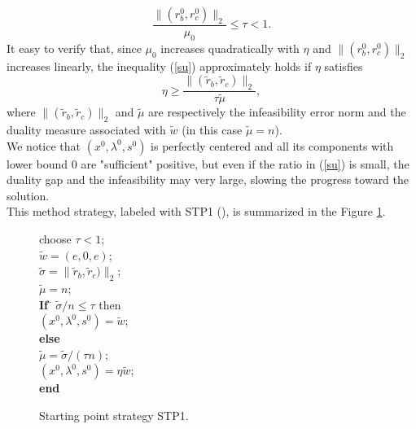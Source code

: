 \documentclass[a4paper,10 pt,titlepage,twoside]{book}
\theoremstyle{plain}
\theoremstyle{definition}
\theoremstyle{remark}
\begin{document}
\begin{equation}\label{su}
\frac{\lVert(r^{0}_{b},r^{0}_{c})\rVert_{2}}{\mu_{0}}\leq \tau<1. 
\end{equation}
It easy to verify that, since $\mu_{0}$ increases quadratically with $\eta$ and $\lVert(r^{0}_{b},r^{0}_{c})\rVert_{2}$ increases linearly, the inequality (\ref{su}) approximately holds if $\eta$ satisfies
\begin{equation*}
\eta\geq \frac{\lVert(\tilde{r}_{b},\tilde{r}_{c})\rVert_{2}}{\tau\tilde{\mu}},
\end{equation*}
where $\lVert(\tilde{r}_{b},\tilde{r}_{c})\rVert_{2}$ and $\tilde{\mu}$ are respectively the infeasibility error norm and the duality measure associated with $\tilde{w}$ (in this case $\tilde{\mu} = n$). \\
We notice that $(x^{0},\lambda^{0},s^{0})$ is perfectly centered and all its components with lower bound 0 are "sufficient" positive, but even if the ratio in (\ref{su}) is small, the duality gap and the infeasibility may very large, slowing the progress toward the solution.\\
This method strategy, labeled with STP1 (\cite{SPS}), is summarized in the Figure \ref{fig:STP2}.\\
\begin{figure}\caption{\label{fig:STP2}Starting point strategy STP1.}
	\centering
	{\noindent\begin{boxedminipage}{1\linewidth}
			\begin{tabbing}
			choose $\tau < 1$; \\
			$\tilde{w}=(e,0,e)$;\\
			$\tilde{\sigma}= \lVert\tilde{r}_{b},\tilde{r}_{c})\rVert_{2}$;\\
			$\tilde{\mu}= n$;\\
			\textbf{If} \= $\tilde{\sigma}/n\leq \tau$ then\\
			\> $(x^{0}, \lambda^{0}, s^{0}) = \tilde{w}$;\\
			\textbf{else}\>\\
			\> $\tilde{\mu}=\tilde{\sigma}/(\tau n)$; \\
			\> $(x^{0}, \lambda^{0}, s^{0}) = \eta \tilde{w}$;\\
			\textbf{end}
			\end{tabbing}
\end{boxedminipage}
} \quad
\end{figure}
\end{document}
